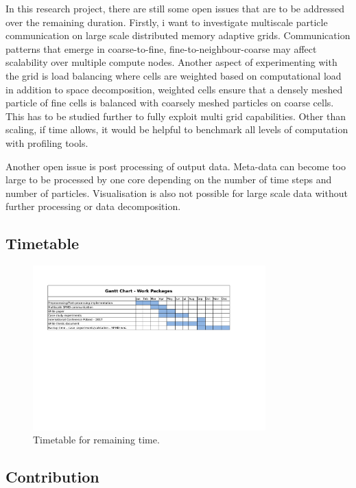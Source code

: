 \documentclass[times,12pt]{article}
\begin{document}
In this research project, there are still some open issues that are to be addressed over the remaining duration. Firstly, i want to investigate multiscale particle communication on large scale distributed memory adaptive grids. Communication patterns that emerge in coarse-to-fine, fine-to-neighbour-coarse may affect scalability over multiple compute nodes. Another aspect of experimenting with the grid is load balancing where cells are weighted based on computational load in addition to space decomposition, weighted cells ensure that a densely meshed particle of fine cells is balanced with coarsely meshed particles on coarse cells. This has to be studied further to fully exploit multi grid capabilities. Other than scaling, if time allows, it would be helpful to benchmark all levels of computation with profiling tools. 

Another open issue is post processing of output data. Meta-data can become too large to be processed by one core depending on the number of time steps and number of particles. Visualisation is also not possible for large scale data without further processing or data decomposition. 

\subsection{Timetable}
\begin{figure}[!h]
\centering
\includegraphics[width=0.8\textwidth]{chart} \protect\caption{\label{nuclearcloseup}Timetable for remaining time.}
\end{figure}

\subsection{Contribution}
\end{document}
